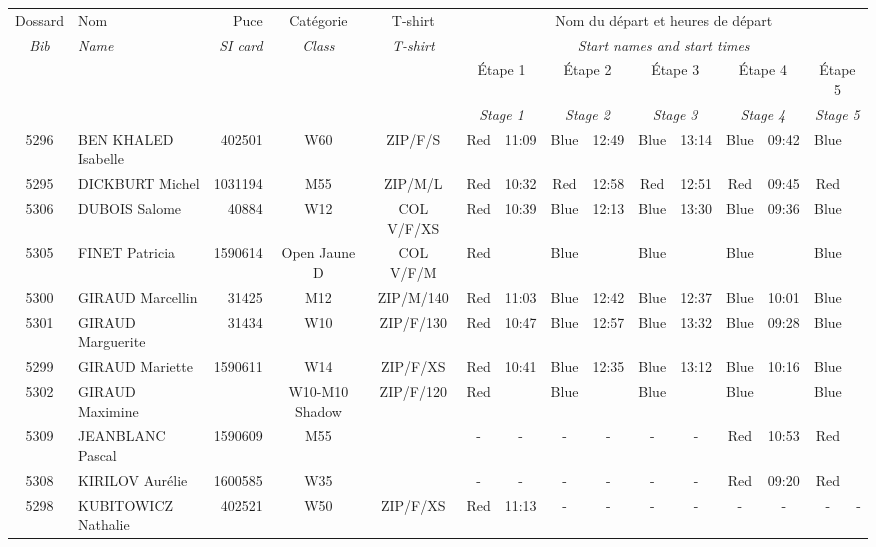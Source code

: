 \documentclass{report}
\begin{document}
  \begin{longtable}{|c|l|r|c|c|*{5}{cc|}}
    Dossard & Nom  & Puce    & Catégorie & T-shirt & \multicolumn{10}{c|}{Nom du départ et heures de départ} \\
    \itshape Bib     & \itshape Name & \itshape SI card & \itshape Class  & \itshape  T-shirt  & \multicolumn{10}{c|}{\itshape Start names and start times} \\
    \hline
    & & & & & \multicolumn{2}{c|}{Étape 1} & \multicolumn{2}{c|}{Étape 2} & \multicolumn{2}{c|}{Étape 3} & \multicolumn{2}{c|}{Étape 4} & \multicolumn{2}{c|}{Étape 5} \\
    & & & & & \multicolumn{2}{c|}{\itshape Stage 1} & \multicolumn{2}{c|}{\itshape Stage 2} & \multicolumn{2}{c|}{\itshape Stage 3} & \multicolumn{2}{c|}{\itshape Stage 4} & \multicolumn{2}{c|}{\itshape Stage 5} \\
    \hline
    5296 & BEN KHALED Isabelle & 402501 & W60 & ZIP/F/S & Red & 11:09 & Blue & 12:49 & Blue & 13:14 & Blue & 09:42 & Blue &  \\
    5295 & DICKBURT Michel & 1031194 & M55 & ZIP/M/L & Red & 10:32 & Red & 12:58 & Red & 12:51 & Red & 09:45 & Red &  \\
    5306 & DUBOIS Salome & 40884 & W12 & COL V/F/XS & Red & 10:39 & Blue & 12:13 & Blue & 13:30 & Blue & 09:36 & Blue &  \\
    5305 & FINET Patricia & 1590614 & Open Jaune D & COL V/F/M & Red &   & Blue &   & Blue &   & Blue &   & Blue &  \\
    5300 & GIRAUD Marcellin & 31425 & M12 & ZIP/M/140 & Red & 11:03 & Blue & 12:42 & Blue & 12:37 & Blue & 10:01 & Blue &  \\
    5301 & GIRAUD Marguerite & 31434 & W10 & ZIP/F/130 & Red & 10:47 & Blue & 12:57 & Blue & 13:32 & Blue & 09:28 & Blue &  \\
    5299 & GIRAUD Mariette & 1590611 & W14 & ZIP/F/XS & Red & 10:41 & Blue & 12:35 & Blue & 13:12 & Blue & 10:16 & Blue &  \\
    5302 & GIRAUD Maximine &  & W10-M10 Shadow & ZIP/F/120 & Red &   & Blue &   & Blue &   & Blue &   & Blue &  \\
    5309 & JEANBLANC Pascal & 1590609 & M55 &   & - &  - & - &  - & - &  - & Red & 10:53 & Red &  \\
    5308 & KIRILOV Aurélie & 1600585 & W35 &   & - &  - & - &  - & - &  - & Red & 09:20 & Red &  \\
    5298 & KUBITOWICZ Nathalie & 402521 & W50 & ZIP/F/XS & Red & 11:13 & - &  - & - &  - & - &  - & - &  -\\

\end{longtable}
\end{document}

